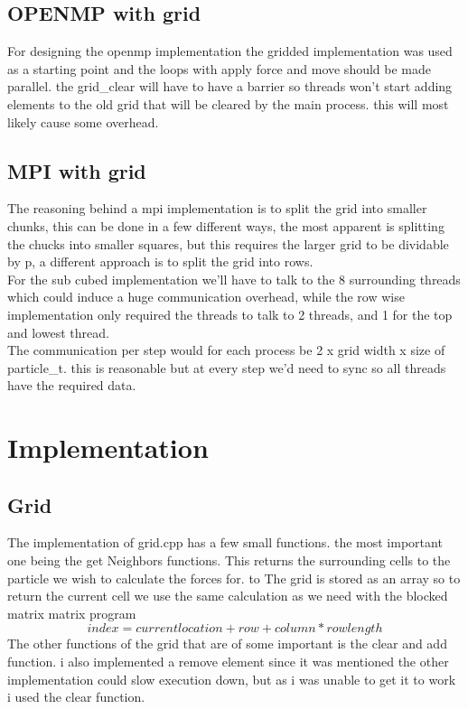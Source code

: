 \documentclass[a4paper,10pt,titlepage]{report}
\begin{document}
\subsection{OPENMP with grid}
For designing the openmp implementation the gridded implementation was used as a starting point and the loops with apply force and move should be made parallel. the grid\_clear will have to have a barrier so threads won't start adding elements to the old grid that will be cleared by the main process. this will most likely cause some overhead.

\subsection{MPI with grid}

The reasoning behind a mpi implementation is to split the grid into smaller chunks, this can be done in a few different ways, the most apparent is splitting the chucks into smaller squares, but this requires the larger grid to be dividable by p, a different approach is to split the grid into rows. \\
For the sub cubed implementation we'll have to talk to the 8 surrounding threads which could induce a huge communication overhead, while the row wise implementation only required the threads to talk to 2 threads, and 1 for the top and lowest thread. \\

The communication per step would for each process be 2 x grid width x size of particle\_t. this is reasonable but at every step we'd need to sync so all threads have the required data. \\

\newpage

\section{Implementation}
\subsection{Grid}
The implementation of grid.cpp has a few small functions. the most important one being the get Neighbors functions. This returns the surrounding cells to the particle we wish to calculate the forces for. to The grid is stored as an array so to return the current cell we use the same calculation as we need with the blocked matrix matrix program
\begin{equation}
index = current location + row + column * row length
\end{equation}
The other functions of the grid that are of some important is the clear and add function. i also implemented a remove element since it was mentioned the other implementation could slow execution down, but as i was unable to get it to work i used the clear function.
\end{document}
